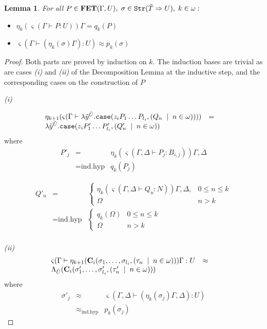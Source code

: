 \documentclass[11pt]{article}
\newtheorem{lemma}[theorem]{Lemma}
\begin{document}
\begin{lemma}\label{lemmm3}
For all $P\in{\bf FET}(\Gamma,U),
\;\sigma\in{\tt Str}(\tilde{T}\Rightarrow U),\; k\in\omega :$
\begin{itemize}
\item[(i)] $\eta_k(\varsigma(\Gamma\vdash P:U))\Gamma=q_k(P)$
\item[(ii)] $\varsigma(\Gamma\vdash(\eta_k(\sigma)\Gamma):U)\approx p_k(\sigma)$
\end{itemize}
\end{lemma}
\begin{proof} Both parts are proved by induction on $k$. The
induction bases are trivial as are cases {\it (i)} and {\it (ii)}
of the Decomposition Lemma at the inductive step, and the
corresponding cases on the construction of $P$

{\it (i)}

\[\begin{array}{lcr}
\eta_{k+1}(\varsigma(\Gamma\vdash \lambda \tilde{y}^{\tilde{U}}
. {\tt case}(z_i P_1\dots P_{l_i},(Q_n\;\mid \; n\in\omega )))) &=& \\
\lambda \tilde{y}^{\tilde{U}}.{\tt case}(z_i P'_1\dots
P'_{l_i},(Q'_n\;\mid \;n\in\omega)) &&
\end{array}
\]
where
\[
\begin{array}{llr}
P'_j &=& \eta_k(\varsigma(\Gamma,\Delta \vdash
P_j:B_{i,j}))\Gamma,\Delta \\
  &= {\mbox{ind.hyp}}& q_k(P_j)
\end{array}
\]

\[ \begin{array}{lll}

Q'_n & = & {\left\{ \begin{array}{cc}
\eta_k(\varsigma(\Gamma,\Delta\vdash Q_n:N))\Gamma,\Delta,& 0\leq
n\leq k\\
\Omega & n>k
\end{array}
\right . } \\
 & = {\mbox{ind.hyp}} & {\left\{ \begin{array}{cc}
q_k(\Omega) & 0\leq n\leq k \\
\Omega & n> k
\end{array}
\right . } \\
\end{array}
\]

{\it (ii)}
\[
\begin{array}{lcr}
\varsigma(\Gamma\vdash
\eta_{k+1}({\bf C}_i(\sigma_1,\dots,\sigma_{l_i},(\tau_n\;\mid \;n\in\omega)))\Gamma:U
 &\approx& \\
\Lambda_{\tilde{U}}({\bf C}_i(\sigma'_1,\dots,\sigma'_{l_i},(\tau'_n\;\mid \;
n\in\omega))) &&
\end{array}\]
where
\[
\begin{array}{lll}
\sigma'_j& \approx&
\varsigma(\Gamma,\Delta\vdash(\eta_k(\sigma_j)\Gamma,\Delta):U)  \\
 &\approx_{\mbox{ind.hyp}} & p_k(\sigma_j)
\end{array}
\]


\end{proof}
\end{document}
